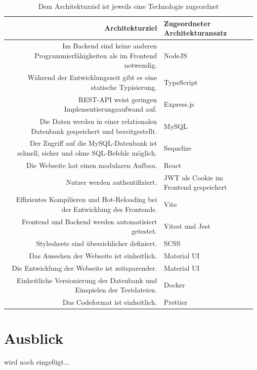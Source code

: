 \documentclass[conference]{IEEEtran}
\begin{document}
\begin{table}
    \centering
    \begin{tabular}{|r|l|}
        \hline
        Architekturziel                                                                       & Zugeordneter Architekturansatz               \\\hline
        Im Backend sind keine anderen Programmierfähigkeiten als im Frontend notwendig.       & NodeJS                                       \\
        Während der Entwicklungszeit gibt es eine statische Typisierung.                      & TypeScript                                   \\
        REST-API weist geringen Implementierungsaufwand auf.                                  & Express.js                                   \\
        Die Daten werden in einer relationalen Datenbank gespeichert und bereitgestellt.      & MySQL                                        \\
        Der Zugriff auf die MySQL-Datenbank ist schnell, sicher und ohne SQL-Befehle möglich. & Sequelize                                    \\
        Die Webseite hat einen modularen Aufbau.                                              & React                                        \\
        Nutzer werden authentifiziert.                                                        & \gls{JWT} als Cookie im Frontend gespeichert \\
        Effizientes Kompilieren und \gls{Hot-Reloading} bei der Entwicklung des Frontends.    & Vite                                         \\
        Frontend und Backend werden automatisiert getestet.                                   & Vitest und Jest                              \\
        Stylesheets sind übersichlicher definiert.                                            & SCSS                                         \\
        Das Aussehen der Webseite ist einheitlich.                                            & Material UI                                  \\
        Die Entwicklung der Webseite ist zeitsparender.                                       & Material UI                                  \\
        Einheitliche Versionierung der Datenbank und Einspielen der Testdateien.              & Docker                                       \\
        Das Codeformat ist einheitlich.                                                       & Prettier                                     \\\hline
    \end{tabular}
    \caption{Dem Architekturziel ist jeweils eine Technologie zugeordnet}
    \label{tab:loesungsstrategie}
\end{table}
\section{Ausblick}
wird noch eingefügt...

\newpage
\printglossary[style=altlist,title=Glossar]
\vspace{12pt}
\end{document}
